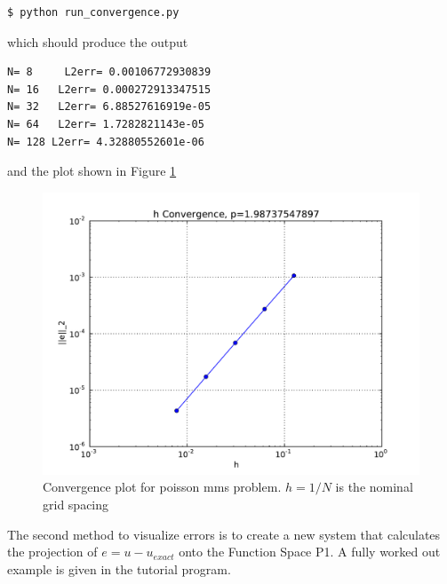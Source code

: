 \begin{lstlisting}[style=Bash]
 $ python run_convergence.py
\end{lstlisting} %
which should produce the output
\begin{lstlisting}[style=Bash]
N= 8     L2err= 0.00106772930839
N= 16   L2err= 0.000272913347515
N= 32   L2err= 6.88527616919e-05
N= 64   L2err= 1.7282821143e-05
N= 128 L2err= 4.32880552601e-06
\end{lstlisting}
and the plot shown in Figure \ref{fig:poisson_convergence}
\begin{figure}[ht!]
  \centering
\includegraphics[width=.6\textwidth]{figures/poisson_convergence.pdf}
  \caption{Convergence plot for poisson mms problem. $h=1/N$ is the nominal grid spacing}
  \label{fig:poisson_convergence}
\end{figure}


The second method to visualize errors is to create a new system that calculates the projection of $e = u - u_{exact}$ onto the Function Space P1.  A fully worked out example is given in the tutorial program.



